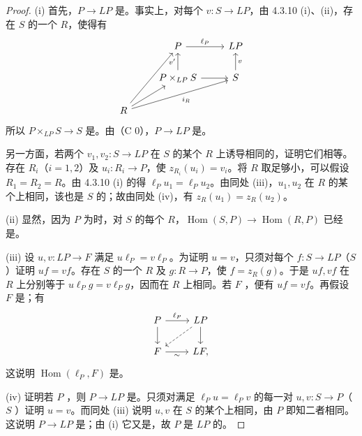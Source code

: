 \begin{proof}
(i) 首先，$P\to LP$ 是。事实上，对每个 $v:S\to LP$，由 4.3.10 (i)、(ii)，存在 $S$ 的一个 $R$，使得有
\[
\begin{tikzcd}
&P\arrow[r,"\ell_P"]&LP\\
&P\times_{LP}S\arrow[u,"v'"]\arrow[r]&S\arrow[u,"v"']\\
R\arrow[uur]\arrow[ur]\arrow[urr,"i_R"']&&
\end{tikzcd}
\]
所以 $P\times_{LP}S\to S$ 是。由（C 0），$P\to LP$ 是。

另一方面，若两个 $v_1,v_2:S\to LP$ 在 $S$ 的某个 $R$ 上诱导相同的，证明它们相等。存在 $R_i$（$i=1,2$）及 $u_i:R_i\to P$，使 $z_{R_i}(u_i)=v_i$。将 $R$ 取足够小，可以假设 $R_1=R_2=R$。由 4.3.10 (i) 的得 $\ell_Pu_1=\ell_Pu_2$。由同处 (iii)，$u_1,u_2$ 在 $R$ 的某个上相同，该也是 $S$ 的；故由同处 (iv)，有 $z_R(u_1)=z_R(u_2)$。

(ii) 显然，因为 $P$ 为时，对 $S$ 的每个 $R$，$\operatorname{Hom}(S,P)\to\operatorname{Hom}(R,P)$ 已经是。

(iii) 设 $u,v:LP\to F$ 满足 $u\ell_P=v\ell_P$。为证明 $u=v$，只须对每个 $f:S\to LP$（$S$ ）证明 $uf=vf$。存在 $S$ 的一个 $R$ 及 $g:R\to P$，使 $f=z_R(g)$。于是 $uf,vf$ 在 $R$ 上分别等于 $u\ell_Pg=v\ell_Pg$，因而在 $R$ 上相同。若 $F$ ，便有 $uf=vf$。再假设 $F$ 是；有
\[
\begin{tikzcd}
P\arrow[r,"\ell_P"]\arrow[d]&LP\arrow[d]\arrow[dl,dashed]\\
F\arrow[r,"\sim"']&LF,
\end{tikzcd}
\]
这说明 $\operatorname{Hom}(\ell_P,F)$ 是。

(iv) 证明若 $P$ ，则 $P\to LP$ 是。只须对满足 $\ell_Pu=\ell_Pv$ 的每一对 $u,v:S\to P$（$S$ ）证明 $u=v$。而同处 (iii) 说明 $u,v$ 在 $S$ 的某个上相同，由 $P$ 即知二者相同。这说明 $P\to LP$ 是；由 (i) 它又是，故 $P$ 是 $LP$ 的。


\end{proof}
